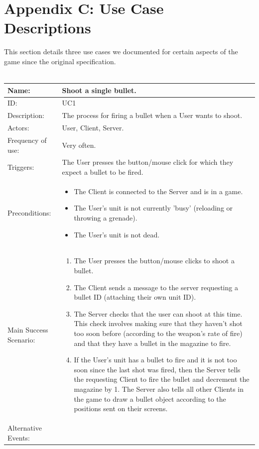\documentclass[12pt]{article}
\newcommand{\return}{\\\\\noindent}
\begin{document}
\section{Appendix C: Use Case Descriptions}
This section details three use cases we documented for certain aspects of the game since the original specification.\return
\begin{tabularx}{\textwidth}{|l|X|} \hline
Name: & \textbf{Shoot a single bullet.} \\ \hline
ID: & UC1 \\ \hline
Description: & The process for firing a bullet when a User wants to shoot. \\ \hline
Actors: & User, Client, Server. \\ \hline
Frequency of use: & Very often. \\ \hline
Triggers: & The User presses the button/mouse click for which they expect a bullet to be fired. \\ \hline
Preconditions: & \begin{itemize}
\item The Client is connected to the Server and is in a game.
\item The User's unit is not currently 'busy' (reloading or throwing a grenade).
\item The User's unit is not dead.
\end{itemize} \\ \hline
Main Success Scenario: & \begin{enumerate}
\item The User presses the button/mouse clicks to shoot a bullet.
\item The Client sends a message to the server requesting a bullet ID (attaching their own unit ID).
\item The Server checks that the user can shoot at this time. This check involves making sure that they haven't shot too soon before (according to the weapon's rate of fire) and that they have a bullet in the magazine to fire.
\item If the  User's unit has a bullet to fire and it is not too soon since the last shot was fired, then the Server tells the requesting Client to fire the bullet and decrement the magazine by 1. The Server also tells all other Clients in the game to draw a bullet object according to the positions sent on their screens.
\end{enumerate} \\ \hline
Alternative Events: & \begin{enumerate}

\end{enumerate}
\end{tabularx}
\end{document}
